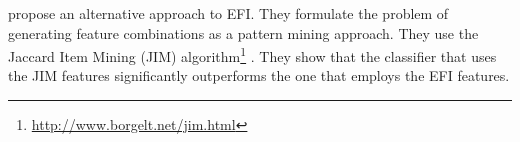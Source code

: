 {} propose an alternative approach to EFI.
They formulate the problem of generating feature combinations as a pattern mining approach.
They use the Jaccard Item Mining (JIM) algorithm\footnote{\url{http://www.borgelt.net/jim.html}} \cite{segond11}.
They show that the classifier that uses the JIM features significantly outperforms the one that employs the EFI features.